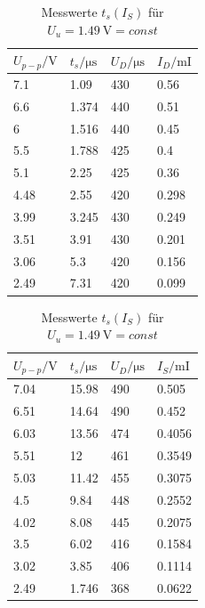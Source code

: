\documentclass[10pt,a4paper]{scrartcl}
\begin{document}
\begin{table}[!ht]
    \centering
    \caption{Messwerte $t_s(I_D)$ für $U_o=1.51~\mathrm V=const$}
    \label{tab:Diode_Uo}
    \begin{tabular}{l|l|l|l}
        $U_{p-p}/\mathrm V$&$t_s/\mathrm{\mu s}$
        &$U_D/\mathrm{\mu s}$&$I_D/\mathrm{mI}$\\
        \hline
        7.1&1.09&430&0.56\\
        6.6&1.374&440&0.51\\
        6&1.516&440&0.45\\
        5.5&1.788&425&0.4\\
        5.1&2.25&425&0.36\\
        4.48&2.55&420&0.298\\
        3.99&3.245&430&0.249\\
        3.51&3.91&430&0.201\\
        3.06&5.3&420&0.156\\
        2.49&7.31&420&0.099
    \end{tabular}
    \medskip
    \caption{Messwerte $t_s(I_S)$ für $U_u=1.49~\mathrm V=const$}
    \label{tab:Diode_Uu}
    \begin{tabular}{l|l|l|l}
        $U_{p-p}/\mathrm V$&$t_s/\mathrm{\mu s}$
        &$U_D/\mathrm{\mu s}$&$I_S/\mathrm{mI}$\\
        \hline
        7.04&15.98&490&0.505\\
        6.51&14.64&490&0.452\\
        6.03&13.56&474&0.4056\\
        5.51&12&461&0.3549\\
        5.03&11.42&455&0.3075\\
        4.5&9.84&448&0.2552\\
        4.02&8.08&445&0.2075\\
        3.5&6.02&416&0.1584\\
        3.02&3.85&406&0.1114\\
        2.49&1.746&368&0.0622\\
    \end{tabular}
\end{table}
\end{document}
